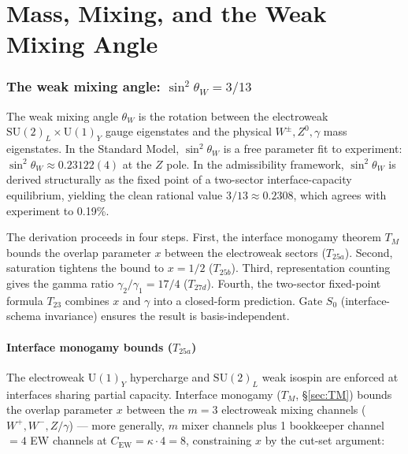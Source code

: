 \documentclass[11pt]{article}
\newcommand{\SU}{\mathrm{SU}}
\newcommand{\Un}{\mathrm{U}}
\theoremstyle{definition}
\begin{document}
\clearpage

\part{Mass, Mixing, and the Weak Mixing Angle}

\section{The weak mixing angle: \texorpdfstring{$\sin^2\theta_W = 3/13$}{sin2 thetaW = 3/13}}\label{sec:sin2thetaW}

The weak mixing angle $\theta_W$ is the rotation between the electroweak $\SU(2)_L \times \Un(1)_Y$ gauge eigenstates and the physical $W^\pm, Z^0, \gamma$ mass eigenstates. In the Standard Model, $\sin^2\theta_W$ is a free parameter fit to experiment: $\sin^2\theta_W \approx 0.23122(4)$ at the $Z$ pole. In the admissibility framework, $\sin^2\theta_W$ is derived structurally as the fixed point of a two-sector interface-capacity equilibrium, yielding the clean rational value $3/13 \approx 0.2308$, which agrees with experiment to 0.19\%.

The derivation proceeds in four steps. First, the interface monogamy theorem $T_M$ bounds the overlap parameter $x$ between the electroweak sectors ($T_{25a}$). Second, saturation tightens the bound to $x = 1/2$ ($T_{25b}$). Third, representation counting gives the gamma ratio $\gamma_2/\gamma_1 = 17/4$ ($T_{27d}$). Fourth, the two-sector fixed-point formula $T_{23}$ combines $x$ and $\gamma$ into a closed-form prediction. Gate $S_0$ (interface-schema invariance) ensures the result is basis-independent.

\subsection{Interface monogamy bounds ($T_{25a}$)}\label{sec:T25a}

The electroweak $\Un(1)_Y$ hypercharge and $\SU(2)_L$ weak isospin are enforced at interfaces sharing partial capacity. Interface monogamy ($T_M$, \S\ref{sec:TM}) bounds the overlap parameter $x$ between the $m = 3$ electroweak mixing channels ($W^+, W^-, Z/\gamma$) --- more generally, $m$ mixer channels plus 1 bookkeeper channel $= 4$ EW channels at $C_{\mathrm{EW}} = \kappa \cdot 4 = 8$, constraining $x$ by the cut-set argument:
\end{document}
